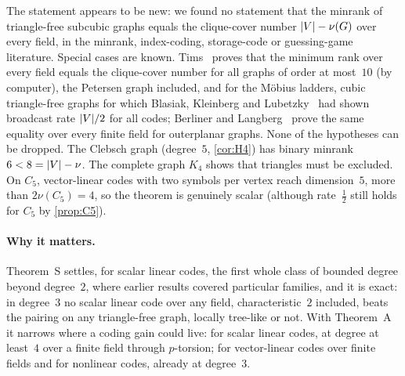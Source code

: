 The statement appears to be new: we found no statement that the minrank of triangle-free subcubic graphs equals the
clique-cover number $\lvert V \rvert-\nu(G)$ over every field, in the minrank, index-coding, storage-code or guessing-game
literature. Special cases are known. Tims~\cite{Tims2013} proves that the minimum rank over
every field equals the clique-cover number for all graphs of order at most~$10$ (by computer), the Petersen graph
included, and for the Möbius ladders, cubic triangle-free graphs for which Blasiak, Kleinberg and
Lubetzky~\cite{BKL2013} had shown broadcast rate $\lvert V \rvert/2$ for all codes; Berliner and
Langberg~\cite{BerlinerLangberg2011} prove the same equality over every finite field for outerplanar graphs. None of the hypotheses can be dropped.
The Clebsch graph (degree~$5$, \cref{cor:H4}) has binary minrank $6<8=\lvert V \rvert-\nu$. The complete graph $K_4$ shows that
triangles must be excluded. On $C_5$, vector-linear codes with two symbols per vertex reach dimension~$5$, more than
$2\nu(C_5)=4$, so the theorem is genuinely scalar (although rate~$\tfrac12$ still holds for $C_5$ by \cref{prop:C5}).

\paragraph{Why it matters.} Theorem~S settles, for scalar linear codes, the first whole class of bounded
degree beyond degree~$2$, where earlier results covered particular families, and it is exact: in degree~$3$ no scalar
linear code over any field, characteristic~$2$ included, beats the pairing on any triangle-free graph, locally
tree-like or not. With Theorem~A it narrows where a coding gain could live: for scalar linear codes, at degree at
least~$4$ over a finite field through $p$-torsion; for vector-linear codes over finite fields and for nonlinear codes,
already at degree~$3$.
